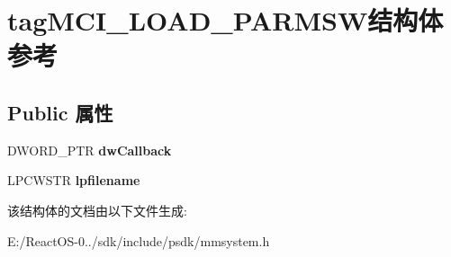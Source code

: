 \hypertarget{structtag_m_c_i___l_o_a_d___p_a_r_m_s_w}{}\section{tag\+M\+C\+I\+\_\+\+L\+O\+A\+D\+\_\+\+P\+A\+R\+M\+S\+W结构体 参考}
\label{structtag_m_c_i___l_o_a_d___p_a_r_m_s_w}
\subsection*{Public 属性}
\begin{DoxyCompactItemize}
\item 
\mbox{\label{structtag_m_c_i___l_o_a_d___p_a_r_m_s_w_a9f7b5cd08916f154e8edc902c0ca91a7}} 
D\+W\+O\+R\+D\+\_\+\+P\+TR {\bfseries dw\+Callback}
\item 
\mbox{\label{structtag_m_c_i___l_o_a_d___p_a_r_m_s_w_a052ab1b8f4b3b9b08e3bc062e837a0e2}} 
L\+P\+C\+W\+S\+TR {\bfseries lpfilename}
\end{DoxyCompactItemize}


该结构体的文档由以下文件生成\+:\begin{DoxyCompactItemize}
\item 
E\+:/\+React\+O\+S-\/0../sdk/include/psdk/mmsystem.\+h\end{DoxyCompactItemize}
